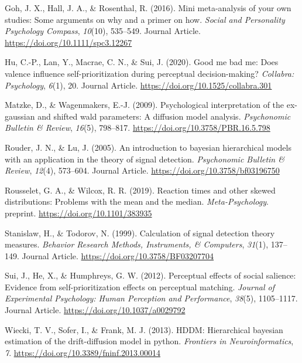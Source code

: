 \documentclass[
  english,
  man]{apa6}
\begin{document}
\leavevmode\hypertarget{ref-Goh_2016_mini}{}%
Goh, J. X., Hall, J. A., \& Rosenthal, R. (2016). Mini meta-analysis of your own studies: Some arguments on why and a primer on how. \emph{Social and Personality Psychology Compass}, \emph{10}(10), 535--549. Journal Article. \url{https://doi.org/10.1111/spc3.12267}

\leavevmode\hypertarget{ref-Hu_2020_GoodSelf}{}%
Hu, C.-P., Lan, Y., Macrae, C. N., \& Sui, J. (2020). Good me bad me: Does valence influence self-prioritization during perceptual decision-making? \emph{Collabra: Psychology}, \emph{6}(1), 20. Journal Article. \url{https://doi.org/10.1525/collabra.301}

\leavevmode\hypertarget{ref-matzke_psychological_2009}{}%
Matzke, D., \& Wagenmakers, E.-J. (2009). Psychological interpretation of the ex-gaussian and shifted wald parameters: A diffusion model analysis. \emph{Psychonomic Bulletin \& Review}, \emph{16}(5), 798--817. \url{https://doi.org/10.3758/PBR.16.5.798}

\leavevmode\hypertarget{ref-Rouder_2005_BHM_SDT}{}%
Rouder, J. N., \& Lu, J. (2005). An introduction to bayesian hierarchical models with an application in the theory of signal detection. \emph{Psychonomic Bulletin \& Review}, \emph{12}(4), 573--604. Journal Article. \url{https://doi.org/10.3758/bf03196750}

\leavevmode\hypertarget{ref-Rousselet_2019}{}%
Rousselet, G. A., \& Wilcox, R. R. (2019). Reaction times and other skewed distributions: Problems with the mean and the median. \emph{Meta-Psychology}. preprint. \url{https://doi.org/10.1101/383935}

\leavevmode\hypertarget{ref-Stanislaw_Todorov_1999}{}%
Stanislaw, H., \& Todorov, N. (1999). Calculation of signal detection theory measures. \emph{Behavior Research Methods, Instruments, \& Computers}, \emph{31}(1), 137--149. Journal Article. \url{https://doi.org/10.3758/BF03207704}

\leavevmode\hypertarget{ref-Sui_2012_JEPHPP}{}%
Sui, J., He, X., \& Humphreys, G. W. (2012). Perceptual effects of social salience: Evidence from self-prioritization effects on perceptual matching. \emph{Journal of Experimental Psychology: Human Perception and Performance}, \emph{38}(5), 1105--1117. Journal Article. \url{https://doi.org/10.1037/a0029792}

\leavevmode\hypertarget{ref-wiecki_hddm_2013}{}%
Wiecki, T. V., Sofer, I., \& Frank, M. J. (2013). HDDM: Hierarchical bayesian estimation of the drift-diffusion model in python. \emph{Frontiers in Neuroinformatics}, \emph{7}. \url{https://doi.org/10.3389/fninf.2013.00014}

\endgroup
\end{document}
